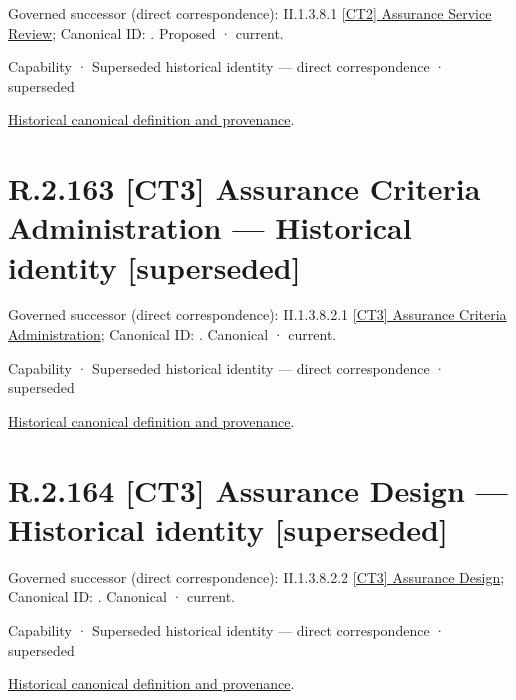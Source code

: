 {\small Governed successor (direct correspondence): II.1.3.8.1 \hyperref[element:b1a791458d644d4794895e4fa42ec83c]{[CT2] Assurance Service Review}; Canonical ID: \texttt{}. Proposed · current.}\par
\label{element:b345cb12b45746409302899514126170}
{\small Capability · Superseded historical identity — direct correspondence · superseded}\par
\href{../../../../continuum/strategy/capability/b345cb12b45746409302899514126170.md}{Historical canonical definition and provenance}.\par
\section*{R.2.163 [CT3] Assurance Criteria Administration — Historical identity [superseded]}
\label{navigation:R.2.163}

{\small Governed successor (direct correspondence): II.1.3.8.2.1 \hyperref[element:1bfd71f24321428c8871b587d413f47e]{[CT3] Assurance Criteria Administration}; Canonical ID: \texttt{}. Canonical · current.}\par
\label{element:6dab08ab1e3249d7b314843ca9ed0149}
{\small Capability · Superseded historical identity — direct correspondence · superseded}\par
\href{../../../../continuum/strategy/capability/6dab08ab1e3249d7b314843ca9ed0149.md}{Historical canonical definition and provenance}.\par
\section*{R.2.164 [CT3] Assurance Design — Historical identity [superseded]}
\label{navigation:R.2.164}

{\small Governed successor (direct correspondence): II.1.3.8.2.2 \hyperref[element:71c8a612b88f4ecba049e94d506bd0c2]{[CT3] Assurance Design}; Canonical ID: \texttt{}. Canonical · current.}\par
\label{element:e1b8db7c95fa4e7ea296351a03532e24}
{\small Capability · Superseded historical identity — direct correspondence · superseded}\par
\href{../../../../continuum/strategy/capability/e1b8db7c95fa4e7ea296351a03532e24.md}{Historical canonical definition and provenance}.\par

